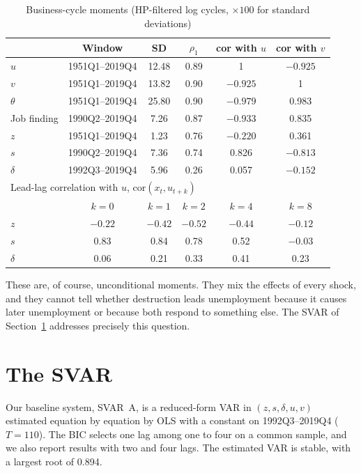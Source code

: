 \documentclass[authoryear, review, 12pt]{elsarticle}
\begin{document}
\begin{table}[H]
\centering
\caption{Business-cycle moments (HP-filtered log cycles, $\times 100$ for standard deviations)}\label{tab:moments}
\small
\begin{tabular}{lccccc}
\toprule
 & Window & SD & $\rho_1$ & cor with $u$ & cor with $v$ \\
\midrule
$u$ & 1951Q1--2019Q4 & 12.48 & 0.89 & 1 & $-0.925$ \\
$v$ & 1951Q1--2019Q4 & 13.82 & 0.90 & $-0.925$ & 1 \\
$\theta$ & 1951Q1--2019Q4 & 25.80 & 0.90 & $-0.979$ & 0.983 \\
Job finding & 1990Q2--2019Q4 & 7.26 & 0.87 & $-0.933$ & 0.835 \\
$z$ & 1951Q1--2019Q4 & 1.23 & 0.76 & $-0.220$ & 0.361 \\
$s$ & 1990Q2--2019Q4 & 7.36 & 0.74 & 0.826 & $-0.813$ \\
$\delta$ & 1992Q3--2019Q4 & 5.96 & 0.26 & 0.057 & $-0.152$ \\
\midrule
\multicolumn{6}{l}{Lead-lag correlation with $u$, $\mathrm{cor}(x_t,u_{t+k})$} \\
 & $k=0$ & $k=1$ & $k=2$ & $k=4$ & $k=8$ \\
$z$ & $-0.22$ & $-0.42$ & $-0.52$ & $-0.44$ & $-0.12$ \\
$s$ & 0.83 & 0.84 & 0.78 & 0.52 & $-0.03$ \\
$\delta$ & 0.06 & 0.21 & 0.33 & 0.41 & 0.23 \\
\bottomrule
\end{tabular}
\end{table}

These are, of course, unconditional moments. They mix the effects of every shock, and they cannot tell whether destruction leads unemployment because it causes later unemployment or because both respond to something else. The SVAR of Section~\ref{sec:svar} addresses precisely this question.

\section{The SVAR}\label{sec:svar}

Our baseline system, SVAR~A, is a reduced-form VAR in $(z, s, \delta, u, v)$ estimated equation by equation by OLS with a constant on 1992Q3--2019Q4 ($T=110$). The BIC selects one lag among one to four on a common sample, and we also report results with two and four lags. The estimated VAR is stable, with a largest root of 0.894.
\end{document}
